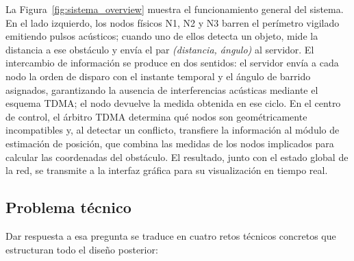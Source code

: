 La Figura~\ref{fig:sistema_overview} muestra el funcionamiento general del sistema. En el lado izquierdo, los nodos físicos N1, N2 y N3 barren el perímetro vigilado emitiendo pulsos acústicos; cuando uno de ellos detecta un objeto, mide la distancia a ese obstáculo y envía el par \textit{(distancia, ángulo)} al servidor. El intercambio de información se produce en dos sentidos: el servidor envía a cada nodo la orden de disparo con el instante temporal y el ángulo de barrido asignados, garantizando la ausencia de interferencias acústicas mediante el esquema TDMA; el nodo devuelve la medida obtenida en ese ciclo. En el centro de control, el árbitro TDMA determina qué nodos son geométricamente incompatibles y, al detectar un conflicto, transfiere la información al módulo de estimación de posición, que combina las medidas de los nodos implicados para calcular las coordenadas del obstáculo. El resultado, junto con el estado global de la red, se transmite a la interfaz gráfica para su visualización en tiempo real.


\subsection{Problema técnico}

Dar respuesta a esa pregunta se traduce en cuatro retos técnicos concretos que estructuran todo el diseño posterior:

